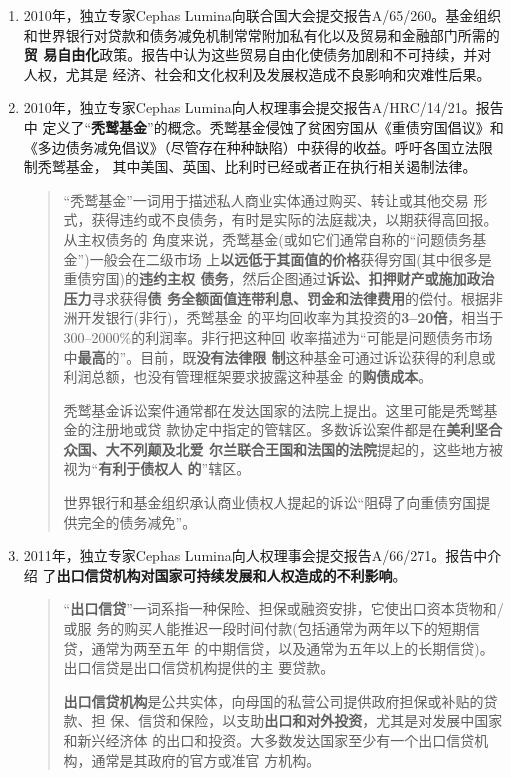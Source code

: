 \begin{enumerate}
\item 2010年，独立专家Cephas Lumina向联合国大会提交报告A/65/260。基金组织
  和世界银行对贷款和债务减免机制常常附加私有化以及贸易和金融部门所需的\textbf{贸
    易自由化}政策。报告中认为这些贸易自由化使债务加剧和不可持续，并对人权，尤其是
  经济、社会和文化权利及发展权造成不良影响和灾难性后果。

\item 2010年，独立专家Cephas Lumina向人权理事会提交报告A/HRC/14/21。报告中
  定义了“\textbf{秃鹫基金}”的概念。秃鹫基金侵蚀了贫困穷国从《重债穷国倡议》和
  《多边债务减免倡议》（尽管存在种种缺陷）中获得的收益。呼吁各国立法限制秃鹫基金，
  其中美国、英国、比利时已经或者正在执行相关遏制法律。
  \begin{quotation}
    “秃鹫基金”一词用于描述私人商业实体通过购买、转让或其他交易
    形式，获得违约或不良债务，有时是实际的法庭裁决，以期获得高回报。从主权债务的
    角度来说，秃鹫基金(或如它们通常自称的“问题债务基金”)一般会在二级市场
    上\textbf{以远低于其面值的价格}获得穷国(其中很多是重债穷国)的\textbf{违约主权
      债务}，然后企图通过\textbf{诉讼、扣押财产或施加政治压力}寻求获得\textbf{债
      务全额面值连带利息、罚金和法律费用}的偿付。根据非洲开发银行(非行)，秃鹫基金
    的平均回收率为其投资的\textbf{3--20倍}，相当于300--2000\%的利润率。非行把这种回
    收率描述为“可能是问题债务市场中\textbf{最高}的”。目前，既\textbf{没有法律限
      制}这种基金可通过诉讼获得的利息或利润总额，也没有管理框架要求披露这种基金
    的\textbf{购债成本}。

    秃鹫基金诉讼案件通常都在发达国家的法院上提出。这里可能是秃鹫基金的注册地或贷
    款协定中指定的管辖区。多数诉讼案件都是在\textbf{美利坚合众国、大不列颠及北爱
      尔兰联合王国和法国的法院}提起的，这些地方被视为“\textbf{有利于债权人
      的}”辖区。

    世界银行和基金组织承认商业债权人提起的诉讼“阻碍了向重债穷国提供完全的债务减免”。
  \end{quotation}

\item 2011年，独立专家Cephas Lumina向人权理事会提交报告A/66/271。报告中介绍
  了\textbf{出口信贷机构对国家可持续发展和人权造成的不利影响}。

  \begin{quotation}
    “\textbf{出口信贷}”一词系指一种保险、担保或融资安排，它使出口资本货物和/或服
    务的购买人能推迟一段时间付款(包括通常为两年以下的短期信贷，通常为两至五年
    的中期信贷，以及通常为五年以上的长期信贷)。出口信贷是出口信贷机构提供的主
    要贷款。

    \textbf{出口信贷机构}是公共实体，向母国的私营公司提供政府担保或补贴的贷款、担
    保、信贷和保险，以支助\textbf{出口和对外投资}，尤其是对发展中国家和新兴经济体
    的出口和投资。大多数发达国家至少有一个出口信贷机构，通常是其政府的官方或准官
    方机构。


\end{quotation}
\end{enumerate}
